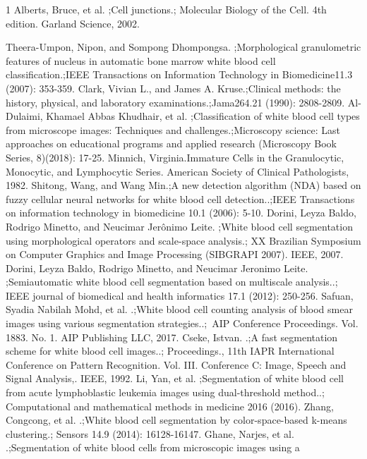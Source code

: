 \documentclass[conference]{IEEEtran}
\begin{document}
\begin{thebibliography}{1}
 Alberts, Bruce, et al. ;Cell junctions.; Molecular Biology of the Cell. 4th edition. Garland Science, 2002.

Theera-Umpon, Nipon, and Sompong Dhompongsa. ;Morphological granulometric features
of nucleus in automatic bone marrow white blood cell classification.;IEEE Transactions on
Information Technology in Biomedicine11.3 (2007): 353-359.
 Clark, Vivian L., and James A. Kruse.;Clinical methods: the history, physical, and laboratory
examinations.;Jama264.21 (1990): 2808-2809.
 Al-Dulaimi, Khamael Abbas Khudhair, et al. ;Classification of white blood cell types from
microscope images: Techniques and challenges.;Microscopy science: Last approaches on
educational programs and applied research (Microscopy Book Series, 8)(2018): 17-25.
 Minnich, Virginia.Immature Cells in the Granulocytic, Monocytic, and Lymphocytic Series.
American Society of Clinical Pathologists, 1982.
 Shitong, Wang, and Wang Min.;A new detection algorithm (NDA) based on fuzzy cellular
neural networks for white blood cell detection..;IEEE Transactions on information technology in
biomedicine 10.1 (2006): 5-10.
Dorini, Leyza Baldo, Rodrigo Minetto, and Neucimar Jerônimo Leite. ;White blood cell
segmentation using morphological operators and scale-space analysis.; XX Brazilian Symposium
on Computer Graphics and Image Processing (SIBGRAPI 2007). IEEE, 2007.
Dorini, Leyza Baldo, Rodrigo Minetto, and Neucimar Jeronimo Leite. ;Semiautomatic white
blood cell segmentation based on multiscale analysis..; IEEE journal of biomedical and health
informatics 17.1 (2012): 250-256.
Safuan, Syadia Nabilah Mohd, et al. .;White blood cell counting analysis of blood smear
images using various segmentation strategies..; AIP Conference Proceedings. Vol. 1883. No. 1.
AIP Publishing LLC, 2017.
Cseke, Istvan. .;A fast segmentation scheme for white blood cell images..; Proceedings.,
11th IAPR International Conference on Pattern Recognition. Vol. III. Conference C: Image,
Speech and Signal Analysis,. IEEE, 1992.
Li, Yan, et al. ;Segmentation of white blood cell from acute lymphoblastic leukemia images
using dual-threshold method..; Computational and mathematical methods in medicine 2016
(2016).
Zhang, Congcong, et al. .;White blood cell segmentation by color-space-based k-means
clustering.; Sensors 14.9 (2014): 16128-16147.
Ghane, Narjes, et al. .;Segmentation of white blood cells from microscopic images using a

\end{thebibliography}
\end{document}
